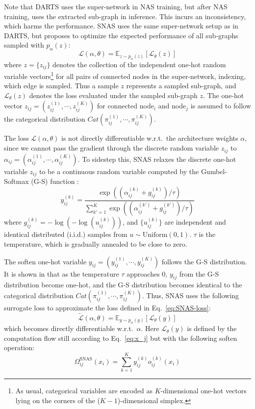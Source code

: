 \documentclass{article}
\newcommand{\neqref}{Eq.~\eqref}
\begin{document}
Note that DARTS uses the super-network in NAS training, but after NAS training, uses the extracted sub-graph in inference. This incurs an inconsistency, which harms the performance.
SNAS uses the same super-network setup as in DARTS, but proposes to optimize the expected performance of all sub-graphs sampled with $p_\alpha(z)$:
\begin{equation}
    \mathcal{L}(\alpha,\theta) = \mathbb{E}_{z\sim p_{\alpha}(z)}[\mathcal{L}_\theta(z)]
    \label{eq:SNAS-loss}
\end{equation}
where $z = \{z_{ij}\}$ denotes the collection of the independent one-hot random variable vectors\footnote{As usual, categorical variables are encoded as $K$-dimensional one-hot vectors lying on the corners of the ($K-1$)-dimensional simplex.} for all pairs of connected nodes in the super-network, indexing, which edge is sampled. Thus a sample $z$ represents a sampled sub-graph, and $\mathcal{L}_\theta(z)$ denotes the loss evaluated under the sampled sub-graph $z$.
The one-hot vector $z_{ij}=(z_{ij}^{(1)}, \cdots, z_{ij}^{(K)})$ for connected node$_i$ and node$_j$ is assumed to follow the categorical distribution $Cat(\pi_{ij}^{(1)}, \cdots, \pi_{ij}^{(K)})$.

The loss $\mathcal{L}(\alpha,\theta)$ is not directly differentiable w.r.t.~the architecture weights $\alpha$, since we cannot pass the gradient through the discrete random variable $z_{ij}$ to $\alpha_{ij}=(\alpha_{ij}^{(1)}, \cdots, \alpha_{ij}^{(K)})$.
To sidestep this, SNAS relaxes the discrete one-hot variable $z_{ij}$ to be a continuous random variable computed by the Gumbel-Softmax (G-S) function \cite{Jang2016Categorical}:
\begin{equation}
    y_{ij}^{(k)}=\frac{\exp((\alpha_{ij}^{(k)}+g_{ij}^{(k)})/\tau)}{\sum_{k'=1}^{K} \exp((\alpha_{ij}^{(k')}+g_{ij}^{(k')})/\tau)}
\end{equation}
where $g_{ij}^{(k)}=-\log(-\log(u_{ij}^{(k)}))$, and $\{u_{ij}^{(k)}\}$ are independent and identical distributed (i.i.d.) samples from $u\sim \text{Uniform}(0,1)$. $\tau$ is the temperature, which is gradually annealed to be close to zero.

The soften one-hot variable $y_{ij}=(y_{ij}^{(1)}, \cdots, y_{ij}^{(K)})$ follows the G-S distribution.
It is shown in \cite{Jang2016Categorical} that as the temperature $\tau$ approaches $0$, $y_{ij}$ from the G-S distribution become one-hot, and the G-S distribution becomes identical to the categorical distribution $Cat(\pi_{ij}^{(1)}, \cdots, \pi_{ij}^{(K)})$. Thus, SNAS uses the following surrogate loss to approximate the loss defined in \neqref{eq:SNAS-loss}:
\begin{equation}
    \tilde{\mathcal{L}}(\alpha,\theta) = \mathbb{E}_{y\sim p_{\alpha}(y)}[\mathcal{L}_\theta(y)]
\end{equation}
which becomes directly differentiable w.r.t.~$\alpha$.
Here $\mathcal{L}_\theta(y)$ is defined by the computation flow still according to \neqref{eq:x_j} but with the following soften operation:
\begin{equation}
    \Omega_{ij}^{\text{SNAS}}(x_i) = \sum_{k=1}^K y_{ij}^{(k)} o_{ij}^{(k)}(x_i)
\end{equation}
\end{document}
